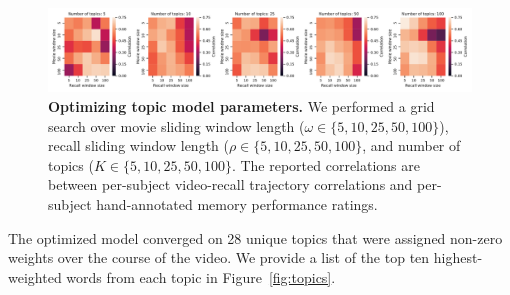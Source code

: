 \documentclass{article}
\begin{document}
\begin{figure}[tp]
\centering
\includegraphics[width=1\textwidth]{figs/parameter_search}
\caption{\small \textbf{Optimizing topic model parameters.}  We performed a grid search over movie sliding window length ($\omega \in \{5, 10, 25, 50, 100 \}$), recall sliding window length ($\rho \in \{5, 10, 25, 50, 100 \}$, and number of topics ($K \in \{5, 10, 25, 50, 100 \}$.  The reported correlations are between per-subject video-recall trajectory correlations and per-subject hand-annotated memory performance ratings.}
\label{fig:paramsearch}
\end{figure}

The optimized model converged on 28 unique topics that were assigned non-zero weights over the course of the video.  We provide a list of the top ten highest-weighted words from each topic in Figure~\ref{fig:topics}.
\end{document}
